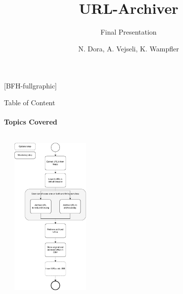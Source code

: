 \documentclass[
ngerman,%
authorontitle=true,
]{bfhbeamer}
\title{URL-Archiver}
\subtitle{Final Presentation}
\author[N. Dora \and A. Vejseli \and K. Wampfler]{N. Dora, A. Vejseli, K. Wampfler}
\institute{School of Engineering and Computer Science}
\begin{document}
	
	[BFH-fullgraphic]
	\maketitle
	
	
	
	\begin{frame}{Table of Content}
		\framesubtitle{Topics Covered}
		\begin{columns} %
			\begin{column}{0.4\textwidth} %
				\tableofcontents
			\end{column}
			\begin{column}{0.6\textwidth} %
				\begin{center}
					\includegraphics[width=0.3\textwidth]{figures/process_model-simple-vertikal}
				\end{center}
			\end{column}
		\end{columns}
	\end{frame}
	
	
	
\end{document}
